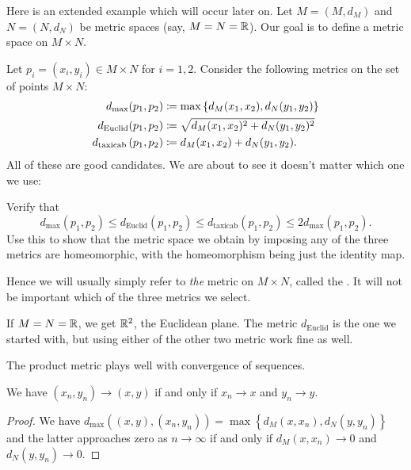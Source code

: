 Here is an extended example which will occur later on.
Let $M = (M, d_M)$ and $N = (N, d_N)$ be metric spaces (say, $M = N = \mathbb R$).
Our goal is to define a metric space on $M \times N$.

Let $p_i = (x_i,y_i) \in M \times N$ for $i=1,2$.
Consider the following metrics on the set of points $M \times N$:
\begin{align*}
	d_{\text{max}} ( p_1, p_2 )
		&\coloneqq \max \left\{ d_M(x_1, x_2), d_N(y_1, y_2) \right\}  \\
	d_{\text{Euclid}} ( p_1, p_2 )
		&\coloneqq \sqrt{d_M(x_1,x_2)^2 + d_N(y_1, y_2)^2} \\
	d_{\text{taxicab}} \left( p_1, p_2 \right)
		&\coloneqq d_M(x_1, x_2) + d_N(y_1, y_2).
\end{align*}
All of these are good candidates.
We are about to see it doesn't matter which one we use:
\begin{exercise}
Verify that
\[ d_{\text{max}}(p_1,p_2)
	\le d_{\text{Euclid}}(p_1, p_2)
	\le d_{\text{taxicab}}(p_1, p_2)
	\le 2d_{\text{max}}(p_1, p_2). \]
Use this to show that the metric space we obtain
by imposing any of the three metrics are homeomorphic,
with the homeomorphism being just the identity map.
\end{exercise}

\begin{definition}
	Hence we will usually simply refer to
	\emph{the} metric on $M \times N$,
	called the .
	It will not be important which of the three metrics we select.
\end{definition}

\begin{example}[$\RR^2$]
	If $M = N = \mathbb R$, we get $\RR^2$, the Euclidean plane.
	The metric $d_{\text{Euclid}}$ is the one we started with,
	but using either of the other two metric work fine as well.
\end{example}

The product metric plays well with convergence of sequences.
\begin{proposition}
	We have $(x_n, y_n) \to (x,y)$
	if and only if $x_n \to x$ and $y_n \to y$.
\end{proposition}
\begin{proof}
	We have $d_{\text{max}} \left( (x,y), (x_n, y_n) \right)
	= \max\left\{ d_M(x, x_n), d_N(y, y_n) \right\}$
	and the latter approaches zero as $n \to \infty$
	if and only if $d_M(x,x_n) \to 0$ and $d_N(y, y_n) \to 0$.
\end{proof}

